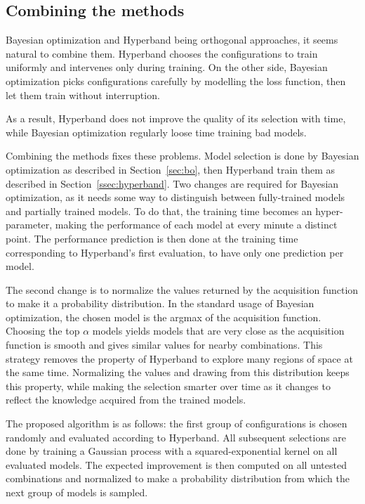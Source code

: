 \subsection{Combining the methods}

Bayesian optimization and Hyperband being orthogonal approaches, it seems natural to combine them. Hyperband chooses the configurations to train uniformly and intervenes only during training. On the other side, Bayesian optimization picks configurations carefully by modelling the loss function, then let them train without interruption.

As a result, Hyperband does not improve the quality of its selection with time, while Bayesian optimization regularly loose time training bad models.

Combining the methods fixes these problems. Model selection is done by Bayesian optimization as described in Section~\ref{sec:bo}, then Hyperband train them as described in Section~\ref{ssec:hyperband}. Two changes are required for Bayesian optimization, as it needs some way to distinguish between fully-trained models and partially trained models. To do that, the training time becomes an hyper-parameter, making the performance of each model at every minute a distinct point. The performance prediction is then done at the training time corresponding to Hyperband's first evaluation, to have only one prediction per model.

The second change is to normalize the values returned by the acquisition function to make it a probability distribution. In the standard usage of Bayesian optimization, the chosen model is the argmax of the acquisition function. Choosing the top $\alpha$ models yields models that are very close as the acquisition function is smooth and gives similar values for nearby combinations. This strategy removes the property of Hyperband to explore many regions of space at the same time. Normalizing the values and drawing from this distribution keeps this property, while making the selection smarter over time as it changes to reflect the knowledge acquired from the trained models.

The proposed algorithm is as follows: the first group of configurations is chosen randomly and evaluated according to Hyperband. All subsequent selections are done by training a Gaussian process with a squared-exponential kernel on all evaluated models. The expected improvement is then computed on all untested combinations and normalized to make a probability distribution from which the next group of models is sampled.

